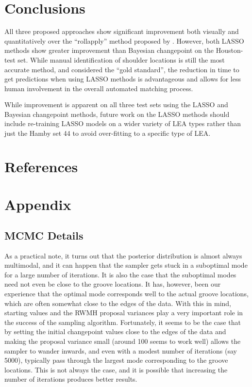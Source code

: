 \documentclass[12pt]{article}
\begin{document}
\section{Conclusions}

All three proposed approaches show significant improvement both visually
and quantitatively over the ``rollapply'' method proposed by
\cite{Hare1}. However, both LASSO methods show greater improvement than
Bayesian changepoint on the Houston-test set. While manual
identification of shoulder locations is still the most accurate method,
and considered the ``gold standard'', the reduction in time to get
predictions when using LASSO methods is advantageous and allows for less
human involvement in the overall automated matching process.

While improvement is apparent on all three test sets using the LASSO and
Bayesian changepoint methods, future work on the LASSO methods should
include re-training LASSO models on a wider variety of LEA types rather
than just the Hamby set 44 to avoid over-fitting to a specific type of
LEA.


\section{References}

\section{Appendix}

\subsection{MCMC Details}

As a practical note, it turns out that the posterior distribution is
almost always multimodal, and it can happen that the sampler gets stuck
in a suboptimal mode for a large number of iterations. It is also the
case that the suboptimal modes need not even be close to the groove
locations. It has, however, been our experience that the optimal mode
corresponds well to the actual groove locations, which are often
somewhat close to the edges of the data. With this in mind, starting
values and the RWMH proposal variances play a very important role in the
success of the sampling algorithm. Fortunately, it seems to be the case
that by setting the initial changepoint values close to the edges of the
data and making the proposal variance small (around 100 seems to work
well) allows the sampler to wander inwards, and even with a modest
number of iterations (say 5000), typically pass through the largest mode
corresponding to the groove locations. This is not always the case, and
it is possible that increasing the number of iterations produces better
results.
\end{document}
